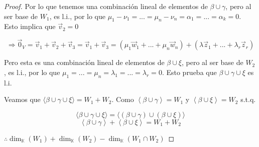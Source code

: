 \documentclass[12pt]{article}
\newcommand\K{\ensuremath{\mathbb{K}}}
\begin{document}
\begin{proof}
    Por lo que tenemos una combinación lineal de elementos de $\beta \cup \gamma$, pero al ser base de $W_1$, es l.i., por lo que $\mu_1-\nu_1 = ... = \mu_n-\nu_n = \alpha_1 = ... = \alpha_k = 0$. Esto implica que $\vec{v}_2 = 0$

    $$\Rightarrow \vec{0}_V = \vec{v}_1 + \vec{v}_2 + \vec{v}_3 = \vec{v}_1 + \vec{v}_3 = (\mu_1 \vec{w}_1 +  ... + \mu_n \vec{w}_n) + (\lambda \vec{z}_1 +  ... + \lambda_r \vec{z}_r)$$

    Pero esta es una combinación lineal de elementos de $\beta \cup \xi$, pero al ser base de $W_2 $, es l.i., por lo que $\mu_1 = ... = \mu_n = \lambda_1 = ... = \lambda_r = 0$. Esto prueba que $\beta \cup \gamma \cup \xi$ es l.i.
    
    \bigskip
    
    Veamos que $\langle \beta \cup \gamma \cup \xi \rangle = W_1 + W_2$. Como $\left\langle \beta \cup \gamma \right\rangle = W_1$ y  $\left\langle \beta \cup \xi \right\rangle = W_2$ s.t.q.

    $$ \langle \beta \cup \gamma \cup \xi \rangle = \langle (\beta \cup \gamma) \cup (\beta \cup \xi )\rangle$$
    $$\left\langle \beta \cup \gamma \right\rangle + \left\langle \beta \cup \xi \right\rangle = W_1 + W_2$$
    
    $\therefore {\dim}_{\K}(W_1) + {\dim}_{\K}(W_2) - {\dim}_{\K}(W_1 \cap W_2)$

\end{proof}
\end{document}
